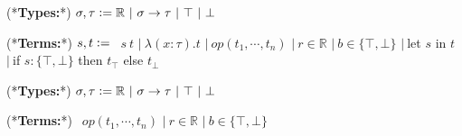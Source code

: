     \begin{deflisting}[caption={Source language},label=lst:source]
    (*\textbf{Types:}*)
        $\sigma,\tau\deq\mathbb{R}\ |\ \sigma\to\tau\ |\ \top\ |\ \bot$

    (*\textbf{Terms:}*)
        $s,t\deq$
        $\ \ s\ t$
        $|\ \lambda(x:\tau).t$
        $|\ op(t_1,\dotsb,t_n)$
        $|\ r\in\mathbb{R}$
        $|\ b\in\{\top,\bot\}$
        $|\ $let $s$ in $t$
        $|\ $if $s:\{\top,\bot\}$ then $t_\top$ else $t_\bot$
    \end{deflisting}

    \begin{deflisting}[caption={Target language},label=lst:target]
    (*\textbf{Types:}*)
        $\sigma,\tau\deq\mathbb{R}\ |\ \sigma\to\tau\ |\ \top\ |\ \bot$

    (*\textbf{Terms:}*)
        $\ \ op(t_1,\dotsb,t_n)$
        $|\ r\in\mathbb{R}$
        $|\ b\in\{\top,\bot\}$
    \end{deflisting}